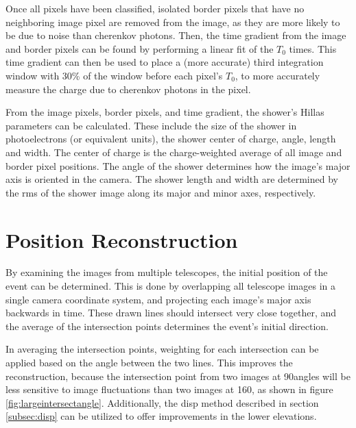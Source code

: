   Once all pixels have been classified, isolated border pixels that have no neighboring image pixel are removed from the image, as they are more likely to be due to noise than cherenkov photons.
  Then, the time gradient from the image and border pixels can be found by performing a linear fit of the $T_{0}$ times.
  This time gradient can then be used to place a (more accurate) third integration window with 30\% of the window before each pixel's $T_{0}$, to more accurately measure the charge due to cherenkov photons in the pixel.

  From the image pixels, border pixels, and time gradient, the shower's Hillas parameters \cite{hillas_params} can be calculated.
  These include the size of the shower in photoelectrons (or equivalent units), the shower center of charge, angle, length and width.
  The center of charge is the charge-weighted average of all image and border pixel positions.
  The angle of the shower determines how the image's major axis is oriented in the camera.
  The shower length and width are determined by the rms of the shower image along its major and minor axes, respectively.

\section{Position Reconstruction}\label{subsec:posrecon}
  By examining the images from multiple telescopes, the initial position of the event can be determined.
  This is done by overlapping all telescope images in a single camera coordinate system, and projecting each image's major axis backwards in time.
  These drawn lines should intersect very close together, and the average of the intersection points determines the event's initial direction.

  In averaging the intersection points, weighting for each intersection can be applied based on the angle between the two lines.
  This improves the reconstruction, because the intersection point from two images at 90\degree angles will be less sensitive to image fluctuations than two images at 160\degree, as shown in figure \ref{fig:largeintersectangle}.
  Additionally, the disp method described in section \ref{subsec:disp} can be utilized to offer improvements in the lower elevations.

